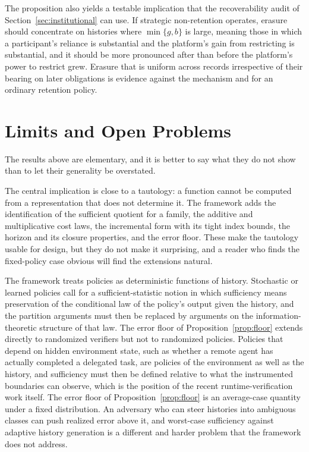 \documentclass[11pt]{article}
\theoremstyle{definition}
\theoremstyle{remark}
\begin{document}
The proposition also yields a testable implication that the recoverability audit of Section~\ref{sec:institutional} can use. If strategic non-retention operates, erasure should concentrate on histories where $\min\{g,b\}$ is large, meaning those in which a participant's reliance is substantial and the platform's gain from restricting is substantial, and it should be more pronounced after than before the platform's power to restrict grew. Erasure that is uniform across records irrespective of their bearing on later obligations is evidence against the mechanism and for an ordinary retention policy.

\section{Limits and Open Problems}\label{sec:limits}

The results above are elementary, and it is better to say what they do not show than to let their generality be overstated.

The central implication is close to a tautology: a function cannot be computed from a representation that does not determine it. The framework adds the identification of the sufficient quotient for a family, the additive and multiplicative cost laws, the incremental form with its tight index bounds, the horizon and its closure properties, and the error floor. These make the tautology usable for design, but they do not make it surprising, and a reader who finds the fixed-policy case obvious will find the extensions natural.

The framework treats policies as deterministic functions of history. Stochastic or learned policies call for a sufficient-statistic notion in which sufficiency means preservation of the conditional law of the policy's output given the history, and the partition arguments must then be replaced by arguments on the information-theoretic structure of that law. The error floor of Proposition~\ref{prop:floor} extends directly to randomized verifiers but not to randomized policies. Policies that depend on hidden environment state, such as whether a remote agent has actually completed a delegated task, are policies of the environment as well as the history, and sufficiency must then be defined relative to what the instrumented boundaries can observe, which is the position of the recent runtime-verification work itself. The error floor of Proposition~\ref{prop:floor} is an average-case quantity under a fixed distribution. An adversary who can steer histories into ambiguous classes can push realized error above it, and worst-case sufficiency against adaptive history generation is a different and harder problem that the framework does not address.
\end{document}
